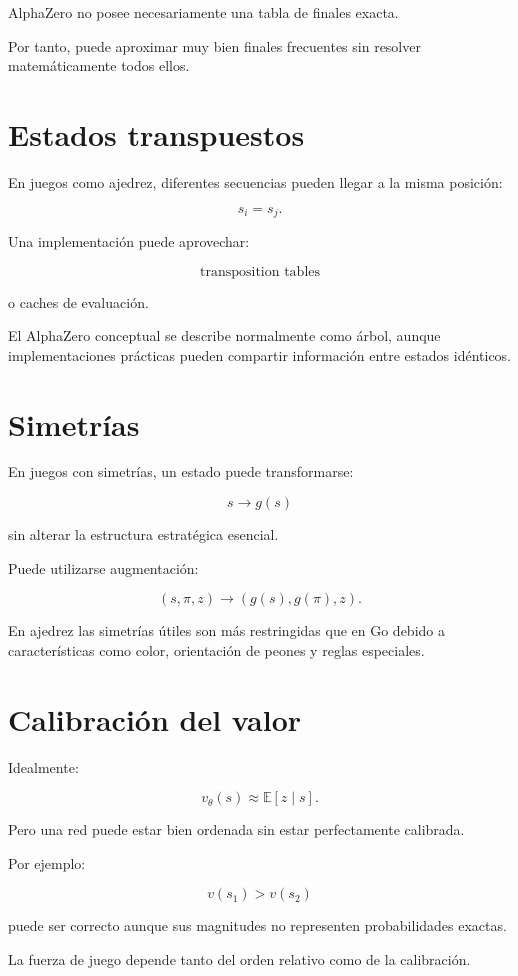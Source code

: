 \documentclass[11pt,a4paper]{article}
\newcommand{\E}{\mathbb{E}}
\begin{document}
AlphaZero no posee necesariamente una tabla de finales exacta.

Por tanto, puede aproximar muy bien finales frecuentes sin resolver matemáticamente todos ellos.

\section{Estados transpuestos}

En juegos como ajedrez, diferentes secuencias pueden llegar a la misma posición:

\[
s_i=s_j.
\]

Una implementación puede aprovechar:

\[
\text{transposition tables}
\]

o caches de evaluación.

El AlphaZero conceptual se describe normalmente como árbol, aunque implementaciones prácticas pueden compartir información entre estados idénticos.

\section{Simetrías}

En juegos con simetrías, un estado puede transformarse:

\[
s
\rightarrow
g(s)
\]

sin alterar la estructura estratégica esencial.

Puede utilizarse augmentación:

\[
(s,\pi,z)
\rightarrow
(g(s),g(\pi),z).
\]

En ajedrez las simetrías útiles son más restringidas que en Go debido a características como color, orientación de peones y reglas especiales.

\section{Calibración del valor}

Idealmente:

\[
v_\theta(s)
\approx
\E[z\mid s].
\]

Pero una red puede estar bien ordenada sin estar perfectamente calibrada.

Por ejemplo:

\[
v(s_1)>v(s_2)
\]

puede ser correcto aunque sus magnitudes no representen probabilidades exactas.

La fuerza de juego depende tanto del orden relativo como de la calibración.
\end{document}
